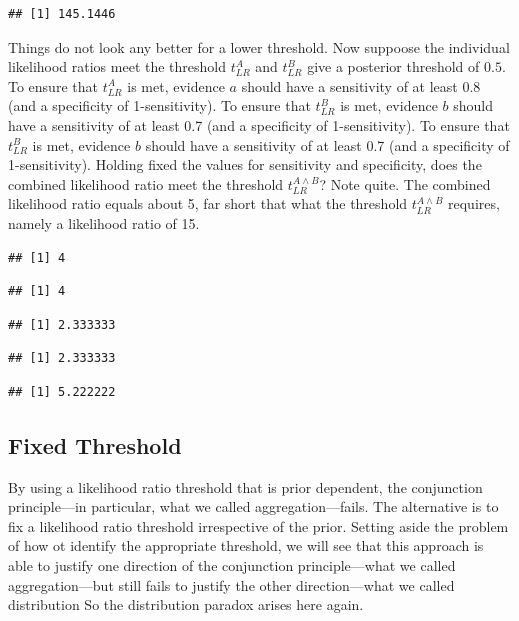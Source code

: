 \documentclass[10pt,dvipsnames,enabledeprecatedfontcommands]{scrartcl}
\begin{document}
\begin{verbatim}
## [1] 145.1446
\end{verbatim}

Things do not look any better for a lower threshold. Now suppoose the
individual likelihood ratios meet the threshold \(t_{LR}^{A}\) and
\(t_{LR}^{B}\) give a posterior threshold of \(0.5\). To ensure that
\(t_{LR}^{A}\) is met, evidence \(a\) should have a sensitivity of at
least 0.8 (and a specificity of 1-sensitivity). To ensure that
\(t_{LR}^{B}\) is met, evidence \(b\) should have a sensitivity of at
least 0.7 (and a specificity of 1-sensitivity). To ensure that
\(t_{LR}^{B}\) is met, evidence \(b\) should have a sensitivity of at
least 0.7 (and a specificity of 1-sensitivity). Holding fixed the values
for sensitivity and specificity, does the combined likelihood ratio meet
the threshold \(t_{LR}^{A\wedge B}\)? Note quite. The combined
likelihood ratio equals about 5, far short that what the threshold
\(t^{A\wedge B}_{LR}\) requires, namely a likelihood ratio of 15.

\begin{verbatim}
## [1] 4
\end{verbatim}

\begin{verbatim}
## [1] 4
\end{verbatim}

\begin{verbatim}
## [1] 2.333333
\end{verbatim}

\begin{verbatim}
## [1] 2.333333
\end{verbatim}

\begin{verbatim}
## [1] 5.222222
\end{verbatim}

\hypertarget{fixed-threshold-1}{%
\subsection{Fixed Threshold}\label{fixed-threshold-1}}

By using a likelihood ratio threshold that is prior dependent, the
conjunction principle---in particular, what we called
aggregation---fails. The alternative is to fix a likelihood ratio
threshold irrespective of the prior. Setting aside the problem of how ot
identify the appropriate threshold, we will see that this approach is
able to justify one direction of the conjunction principle---what we
called aggregation---but still fails to justify the other
direction---what we called distribution So the distribution paradox
arises here again.
\end{document}
